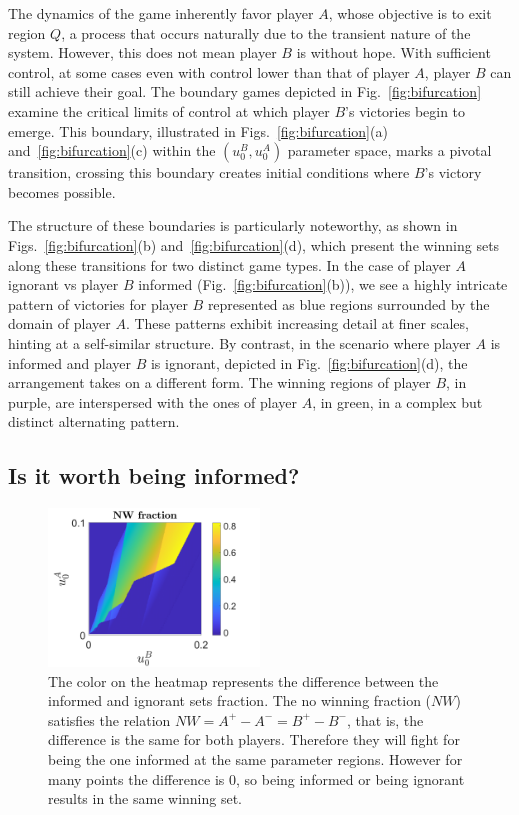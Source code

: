 The dynamics of the game inherently favor player $A$, whose objective is to exit region $Q$, a process that occurs naturally due to the transient nature of the system. However, this does not mean player $B$ is without hope. With sufficient control, at some cases even with control lower than that of player $A$, player $B$ can still achieve their goal. The boundary games depicted in Fig.~\ref{fig:bifurcation} examine the critical limits of control at which player $B$’s victories begin to emerge. This boundary, illustrated in Figs.~\ref{fig:bifurcation}(a) and~\ref{fig:bifurcation}(c) within the $(u_0^B, u_0^A)$ parameter space, marks a pivotal transition, crossing this boundary creates initial conditions where $B$’s victory becomes possible. 



The structure of these boundaries is particularly noteworthy, as shown in Figs.~\ref{fig:bifurcation}(b) and~\ref{fig:bifurcation}(d), which present the winning sets along these transitions for two distinct game types. In the case of player $A$ ignorant vs player $B$ informed (Fig.~\ref{fig:bifurcation}(b)), we see a highly intricate pattern of victories for player $B$ represented as blue regions surrounded by the domain of player $A$. These patterns exhibit increasing detail at finer scales, hinting at a self-similar structure. By contrast, in the scenario where player $A$ is informed and player $B$ is ignorant, depicted in Fig.~\ref{fig:bifurcation}(d), the arrangement takes on a different form. The winning regions of player $B$, in purple, are interspersed with the ones of player $A$, in green, in a complex but distinct alternating pattern.






\subsection{Is it worth being informed?}


\begin{figure}
    \centering
    \includegraphics[trim={0cm 0cm 0cm 0cm}, clip,width=0.5\textwidth ]{Images/P5/diferencia.png}
    \caption{The color on the heatmap represents the difference between the informed and ignorant sets fraction. The no winning fraction ($NW$) satisfies the relation $NW = A^{+} - A^{-} = B^{+} - B^{-}$, that is, the difference is the same for both players. Therefore they will fight for being the one informed at the same parameter regions. However for many points the difference is $0$, so being informed or being ignorant results in the same winning set.}
    \label{fig:diferencia}
\end{figure}



